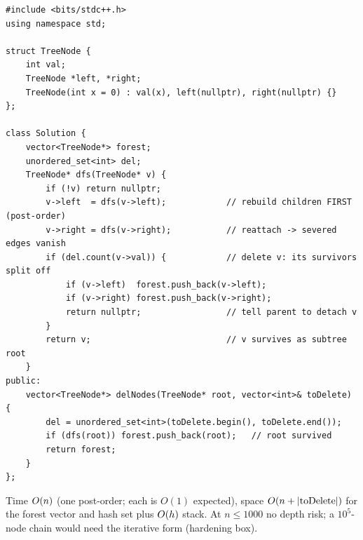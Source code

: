 \begin{lstlisting}[caption={Delete Nodes And Return Forest (LeetCode 1110) -- post-order, return-new-root}, label={lst:c02-delete-forest}]
#include <bits/stdc++.h>
using namespace std;

struct TreeNode {
    int val;
    TreeNode *left, *right;
    TreeNode(int x = 0) : val(x), left(nullptr), right(nullptr) {}
};

class Solution {
    vector<TreeNode*> forest;
    unordered_set<int> del;
    TreeNode* dfs(TreeNode* v) {
        if (!v) return nullptr;
        v->left  = dfs(v->left);            // rebuild children FIRST (post-order)
        v->right = dfs(v->right);           // reattach -> severed edges vanish
        if (del.count(v->val)) {            // delete v: its survivors split off
            if (v->left)  forest.push_back(v->left);
            if (v->right) forest.push_back(v->right);
            return nullptr;                 // tell parent to detach v
        }
        return v;                           // v survives as subtree root
    }
public:
    vector<TreeNode*> delNodes(TreeNode* root, vector<int>& toDelete) {
        del = unordered_set<int>(toDelete.begin(), toDelete.end());
        if (dfs(root)) forest.push_back(root);   // root survived
        return forest;
    }
};
\end{lstlisting}


\begin{complexitybox}
Time $O(n)$ (one post-order; each  is $O(1)$ expected), space
$O(n+|\text{toDelete}|)$ for the forest vector and hash set plus $O(h)$
stack. At $n\le1000$ no depth risk; a $10^{5}$-node chain would need the iterative
form (hardening box).
\end{complexitybox}

